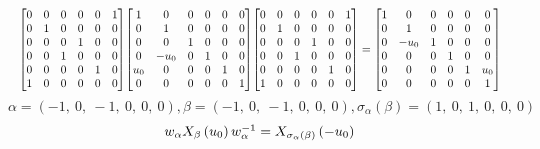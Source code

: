 \documentclass[11pt]{article}
\theoremstyle{definition}
\begin{document}
\[
\scaletoalign{\textwidth}{{\left[\begin{matrix}0 & 0 & 0 & 0 & 0 & 1\\0 & 1 & 0 & 0 & 0 & 0\\0 & 0 & 0 & 1 & 0 & 0\\0 & 0 & 1 & 0 & 0 & 0\\0 & 0 & 0 & 0 & 1 & 0\\1 & 0 & 0 & 0 & 0 & 0\end{matrix}\right]} {\left[\begin{matrix}1 & 0 & 0 & 0 & 0 & 0\\0 & 1 & 0 & 0 & 0 & 0\\0 & 0 & 1 & 0 & 0 & 0\\0 & - u_{0} & 0 & 1 & 0 & 0\\u_{0} & 0 & 0 & 0 & 1 & 0\\0 & 0 & 0 & 0 & 0 & 1\end{matrix}\right]} {\left[\begin{matrix}0 & 0 & 0 & 0 & 0 & 1\\0 & 1 & 0 & 0 & 0 & 0\\0 & 0 & 0 & 1 & 0 & 0\\0 & 0 & 1 & 0 & 0 & 0\\0 & 0 & 0 & 0 & 1 & 0\\1 & 0 & 0 & 0 & 0 & 0\end{matrix}\right]} = {\left[\begin{matrix}1 & 0 & 0 & 0 & 0 & 0\\0 & 1 & 0 & 0 & 0 & 0\\0 & - u_{0} & 1 & 0 & 0 & 0\\0 & 0 & 0 & 1 & 0 & 0\\0 & 0 & 0 & 0 & 1 & u_{0}\\0 & 0 & 0 & 0 & 0 & 1\end{matrix}\right]}}
\]
\[
\alpha = \left( -1, \  0, \  -1, \  0, \  0, \  0\right), \beta = \left( -1, \  0, \  -1, \  0, \  0, \  0\right), \sigma_{\alpha}(\beta) = \left( 1, \  0, \  1, \  0, \  0, \  0\right)
\]
\[
\scaletoalign{\textwidth}{w_{\alpha} X_{\beta}\left(u_{0}\right) w_{\alpha}^{-1} = X_{\sigma_{\alpha}\left(\beta\right)}\left(- u_{0}\right)}
\]
\end{document}
